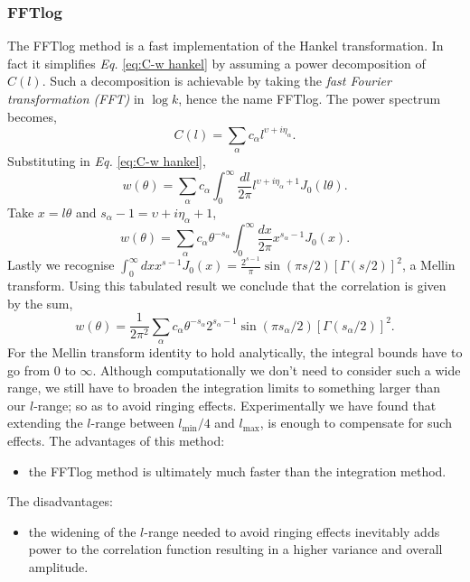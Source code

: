 \subsubsection{FFTlog}
\label{sec:FFTlog method}
The FFTlog method \cite{fftlog} is a fast implementation of the Hankel transformation. In fact it simplifies \textit{Eq. }\eqref{eq:C-w hankel} by assuming a power decomposition of $C(l)$. Such a decomposition is achievable by taking the \textit{fast Fourier transformation (FFT)} in $\log k$, hence the name FFTlog. The power spectrum becomes,
\begin{equation}
    C(l)=\sum_\alpha c_\alpha l^{\upsilon + i\eta_\alpha}.
\end{equation}
Substituting in \textit{Eq. }\eqref{eq:C-w hankel},
\begin{equation*}
    w(\theta) = \sum_\alpha c_\alpha \int_0^\infty \frac{dl}{2\pi} l^{\upsilon + i\eta_\alpha+1} J_0(l\theta).
\end{equation*}
Take $x=l\theta$ and $s_\alpha-1=\upsilon + i\eta_\alpha+1$,
\begin{equation*}
    w(\theta) = \sum_\alpha c_\alpha \theta^{-s_\alpha} \int_0^\infty \frac{dx}{2\pi} x^{s_\alpha-1} J_0(x).
\end{equation*}
Lastly we recognise $\int_0^\infty dx x^{s-1}J_0(x) = \frac{2^{s-1}}{\pi}\sin(\pi s/2) [\Gamma(s/2)]^2$, a Mellin transform. Using this tabulated result we conclude that the correlation is given by the sum,
\begin{equation}
    w(\theta) = \frac{1}{2\pi^2}\sum_\alpha c_\alpha \theta^{-s_\alpha}2^{s_\alpha-1}\sin(\pi s_\alpha/2) [\Gamma(s_\alpha/2)]^2.
\end{equation}
For the Mellin transform identity to hold analytically, the integral bounds have to go from 0 to $\infty$. Although computationally we don't need to consider such a wide range, we still have to broaden the integration limits to something larger than our $l$-range; so as to avoid ringing effects. Experimentally we have found that extending the $l$-range between $l_{\text{min}}/4$ and $l_{\text{max}}$, is enough to compensate for such effects. The advantages of this method:
\begin{itemize}
    \item the FFTlog method is ultimately much faster than the integration method.
\end{itemize}
The disadvantages:
\begin{itemize}
    \item the widening of the $l$-range needed to avoid ringing effects inevitably adds power to the correlation function resulting in a higher variance and overall amplitude.
\end{itemize}

